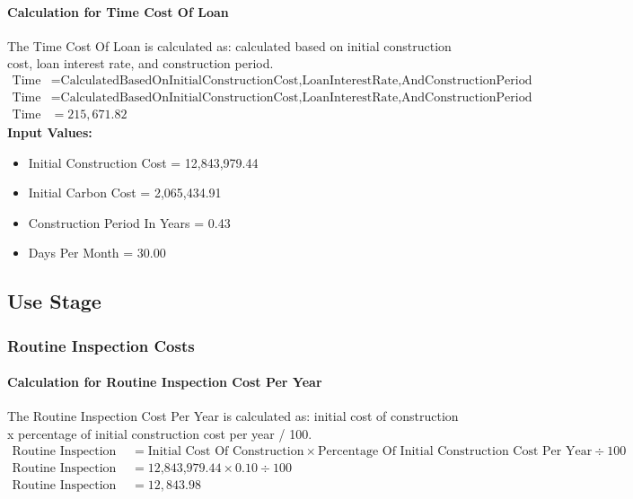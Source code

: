 \documentclass{article}
\begin{document}
 \paragraph{Calculation for Time Cost Of Loan} 
The Time Cost Of Loan is calculated as: calculated based on initial construction cost, loan interest rate, and construction period.
\begin{align*}
 \text{Time Cost Of Loan} &= \text{Calculated} \text{Based} \text{On} \text{Initial} \text{Construction} \text{Cost,} \text{Loan} \text{Interest} \text{Rate,} \text{And} \text{Construction} \text{Period} \\
 \text{Time Cost Of Loan} &= \text{Calculated} \text{Based} \text{On} \text{Initial} \text{Construction} \text{Cost,} \text{Loan} \text{Interest} \text{Rate,} \text{And} \text{Construction} \text{Period} \\
 \text{Time Cost Of Loan} &= 215,671.82 
\end{align*}
\textbf{Input Values:}
\begin{itemize}
\item Initial Construction Cost = 12,843,979.44
\item Initial Carbon Cost = 2,065,434.91
\item Construction Period In Years = 0.43
\item Days Per Month = 30.00
\end{itemize}
\subsection{Use Stage}
\subsubsection{Routine Inspection Costs}
 \paragraph{Calculation for Routine Inspection Cost Per Year} 
The Routine Inspection Cost Per Year is calculated as: initial cost of construction x percentage of initial construction cost per year / 100.
\begin{align*}
 \text{Routine Inspection Cost Per Year} &= \text{Initial Cost Of Construction} \times \text{Percentage Of Initial Construction Cost Per Year} \div 100 \\
 \text{Routine Inspection Cost Per Year} &= \text{12,843,979.44} \times 0.10 \div 100 \\
 \text{Routine Inspection Cost Per Year} &= 12,843.98 
\end{align*}
\end{document}
